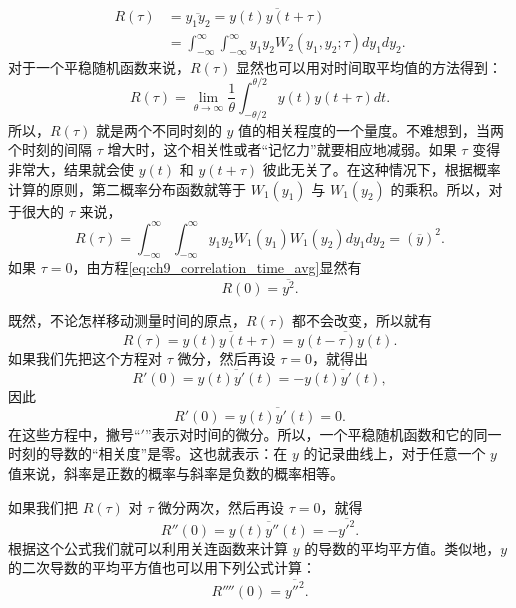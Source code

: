 \begin{equation}
\label{eq:ch9_correlation_def}
\begin{aligned}
R(\tau) &= \overline{y_1 y_2} = \overline{y(t) y(t+\tau)} \\
&= \int_{-\infty}^{\infty} \int_{-\infty}^{\infty} y_1 y_2 W_2(y_1,y_2;\tau) dy_1 dy_2.
\end{aligned}
\end{equation}
对于一个平稳随机函数来说，$ R(\tau) $ 显然也可以用对时间取平均值的方法得到：
\begin{equation}\label{eq:ch9_correlation_time_avg}
R(\tau) = \lim_{\theta \to \infty} \frac{1}{\theta} \int_{-\theta/2}^{\theta/2} y(t) y(t+\tau) dt.
\end{equation}
所以，$ R(\tau) $ 就是两个不同时刻的 $ y $ 值的相关程度的一个量度。不难想到，当两个时刻的间隔 $ \tau $ 增大时，这个相关性或者“记忆力”就要相应地减弱。如果 $ \tau $ 变得非常大，结果就会使 $ y(t) $ 和 $ y(t+\tau) $ 彼此无关了。在这种情况下，根据概率计算的原则，第二概率分布函数就等于 $ W_1(y_1) $ 与 $ W_1(y_2) $ 的乘积。所以，对于很大的 $ \tau $ 来说，
\begin{equation}\label{eq:ch9_correlation_large_tau}
R(\tau) = \int_{-\infty}^{\infty} \int_{-\infty}^{\infty} y_1 y_2 W_1(y_1) W_1(y_2) dy_1 dy_2 = (\overline{y})^2.
\end{equation}
如果 $ \tau=0 $，由方程\eqref{eq:ch9_correlation_time_avg}显然有
\begin{equation}
\label{eq:ch9_correlation_zero}
R(0) = \overline{y^2}.
\end{equation}

既然，不论怎样移动测量时间的原点，$ R(\tau) $ 都不会改变，所以就有
\[
R(\tau) = \overline{y(t) y(t+\tau)} = \overline{y(t-\tau) y(t)}.
\]
如果我们先把这个方程对 $ \tau $ 微分，然后再设 $ \tau=0 $，就得出
\[
R'(0) = \overline{y(t) y'(t)} = -\overline{y(t) y'(t)},
\]
因此
\begin{equation}\label{eq:ch9_correlation_derivative_zero}
R'(0) = \overline{y(t) y'(t)} = 0.
\end{equation}
在这些方程中，撇号“$'$”表示对时间的微分。所以，一个平稳随机函数和它的同一时刻的导数的“相关度”是零。这也就表示：在 $ y $ 的记录曲线上，对于任意一个 $ y $ 值来说，斜率是正数的概率与斜率是负数的概率相等。

如果我们把 $ R(\tau) $ 对 $ \tau $ 微分两次，然后再设 $ \tau=0 $，就得
\begin{equation}\label{eq:ch9_correlation_second_derivative}
R''(0) = \overline{y(t) y''(t)} = -\overline{y'^2}.
\end{equation}
根据这个公式我们就可以利用关连函数来计算 $ y $ 的导数的平均平方值。类似地，$ y $ 的二次导数的平均平方值也可以用下列公式计算：
\begin{equation}\label{eq:ch9_correlation_fourth_derivative}
R''''(0) = \overline{y''^2}.
\end{equation}


